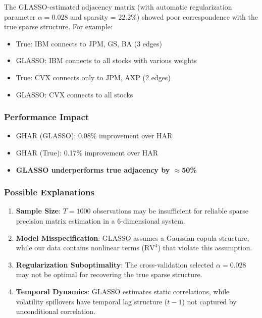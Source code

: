 \documentclass[10pt,a4paper]{article}
\newcommand{\RV}{\text{RV}}
\begin{document}
The GLASSO-estimated adjacency matrix (with automatic regularization parameter $\alpha = 0.028$ and sparsity = 22.2\%) showed poor correspondence with the true sparse structure. For example:

\begin{itemize}
\item True: IBM connects to JPM, GS, BA (3 edges)
\item GLASSO: IBM connects to all stocks with various weights
\item True: CVX connects only to JPM, AXP (2 edges)
\item GLASSO: CVX connects to all stocks
\end{itemize}

\subsubsection{Performance Impact}

\begin{itemize}
\item GHAR (GLASSO): 0.08\% improvement over HAR
\item GHAR (True): 0.17\% improvement over HAR
\item \textbf{GLASSO underperforms true adjacency by $\approx$50\%}
\end{itemize}

\subsubsection{Possible Explanations}

\begin{enumerate}
\item \textbf{Sample Size}: $T = 1000$ observations may be insufficient for reliable sparse precision matrix estimation in a 6-dimensional system.

\item \textbf{Model Misspecification}: GLASSO assumes a Gaussian copula structure, while our data contains nonlinear terms ($\RV^4$) that violate this assumption.

\item \textbf{Regularization Suboptimality}: The cross-validation selected $\alpha = 0.028$ may not be optimal for recovering the true sparse structure.

\item \textbf{Temporal Dynamics}: GLASSO estimates static correlations, while volatility spillovers have temporal lag structure ($t-1$) not captured by unconditional correlation.
\end{enumerate}
\end{document}
